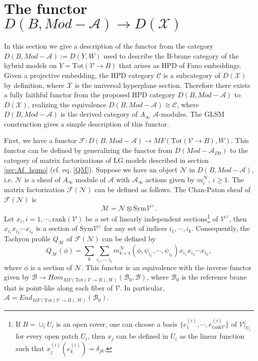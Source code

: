 \documentclass[a4paper,11pt]{article}
\numberwithin{equation}{section}
\begin{document}
\section{The functor $D(B,Mod-\mathcal{A}) \rightarrow 
D(\mathcal{X})$}\label{sec:functor}

In this section we give a description of the functor from the category 
$D(B,Mod-\mathcal{A}):=D(Y,W)$ used to describe the B-brane category of the 
hybrid models on $Y=\mathrm{Tot}(\mathcal{V}\rightarrow B)$ that arises as HPD 
of Fano embeddings. Given a projective embedding, the HPD category $\mathcal{C}$ 
is a subcategory of 
$D(\mathcal{X})$ by definition, where $\mathcal{X}$ is the universal hyperplane 
section. Therefore there exists a fully faithful functor from the proposed HPD 
category $D(B,Mod-\mathcal{A})$ to $D(\mathcal{X})$, realizing the 
equivalence $D(B,Mod-\mathcal{A}) \cong \mathcal{C}$, where 
$D(B,Mod-\mathcal{A})$ is the derived category of $A_\infty$ 
$\mathcal{A}$-modules. The GLSM construction gives a simple description of this 
functor.

First, we have a functor $\mathcal{F}: D(B, Mod-\mathcal{A}) \rightarrow 
MF(\mathrm{Tot}(\mathcal{V}\rightarrow B),W)$. This functor can be defined by 
generalizing the functor from $D(Mod-\mathcal{A}_{D0})$ to the category of 
matrix factorizations of LG models described in section \ref{sec:Af_homo} (cf. 
eq. \eqref{QM}). Suppose we have an object $\mathcal{N}$ in $D(B, 
Mod-\mathcal{A})$, i.e. $\mathcal{N}$ is a sheaf of $A_\infty$ module of 
$\mathcal{A}$ with $\mathcal{A}_\infty$ actions given by $m^{\mathcal{N}}_i$, $i 
\geq 1$. The matrix factorization $\mathcal{F}(\mathcal{N})$ can be defined as 
follows. The Chan-Paton sheaf of $\mathcal{F}(\mathcal{N})$ is
\[
\mathcal{M} = \mathcal{N} \otimes \mathrm{Sym} \mathcal{V}^\vee.
\]
Let $x_i, i=1,\cdots,\mathrm{rank}(\mathcal{V})$ be a set of linearly independent sections\footnote{If $B=\cup_i U_i$ is an open cover, one can choose a basis $\{ e^{(i)}_1, \cdots, e^{(i)}_{\mathrm{rank}\mathcal{V}}\}$ of $\mathcal{V}|_{U_i}$ for every open patch $U_i$, then $x_j$ can be defined in $U_i$ as the linear function such that $x^{(i)}_j(e^{(i)}_k) = \delta_{jk}$.} of $\mathcal{V}^\vee$, then $x_{i_1} x_{i_2} \cdots x_{i_k}$ is a section of $\mathrm{Sym} \mathcal{V}^\vee$ for any set of indices $i_1,\cdots,i_k$. Consequently, the Tachyon profile $Q_{\mathcal{M}}$ of $\mathcal{F}(\mathcal{N})$ can be defined by
\[
Q_{\mathcal{M}}(\phi) = \sum_{k} \sum_{i_1,\cdots,i_k} m^{\mathcal{N}}_{k+1}(\phi,\psi_{i_1},\cdots,\psi_{i_k})x_{i_1} x_{i_2} \cdots x_{i_k},
\]
where $\phi$ is a section of $\mathcal{N}$. This functor is an equivalence with the inverse functor given by $\mathcal{B} \rightarrow Hom_{MF(\mathrm{Tot}(\mathcal{V}\rightarrow B),W)}(\mathcal{B}_0,\mathcal{B})$, where $\mathcal{B}_0$ is the reference brane that is point-like along each fiber of $\mathcal{V}$. In particular, $\mathcal{A} = End_{MF(\mathrm{Tot}(\mathcal{V}\rightarrow B),W)}(\mathcal{B}_0)$.
\end{document}
